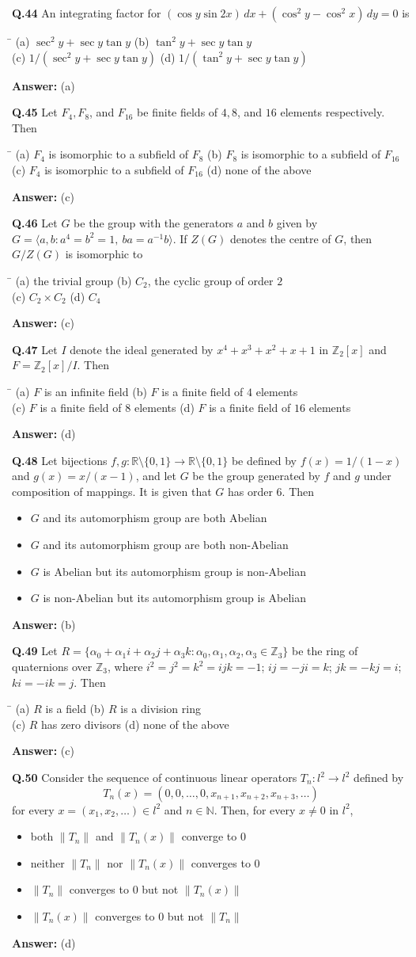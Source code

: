 \documentclass[11pt,a4paper]{article}
\newcommand{\optsfour}[4]{%
  \begin{tabbing}
    \hspace{0.48\linewidth}\=\kill
    (a) #1 \> (b) #2 \\[2pt]
    (c) #3 \> (d) #4
  \end{tabbing}%
}
\newcommand{\optslist}[4]{%
  \begin{itemize}
    \setlength{\itemsep}{2pt}\setlength{\parskip}{0pt}
    \item[(a)] #1
    \item[(b)] #2
    \item[(c)] #3
    \item[(d)] #4
  \end{itemize}%
}
\newcommand{\ans}[1]{\textbf{Answer:} #1\par\medskip}
\begin{document}
\textbf{Q.44} An integrating factor for $(\cos y \sin 2x)\,dx + (\cos^2 y - \cos^2 x)\,dy = 0$ is
\optsfour{$\sec^2 y + \sec y \tan y$}{$\tan^2 y + \sec y \tan y$}{$1/(\sec^2 y + \sec y \tan y)$}{$1/(\tan^2 y + \sec y \tan y)$}
\ans{(a)}

\textbf{Q.45} Let $F_4, F_8$, and $F_{16}$ be finite fields of $4, 8$, and $16$ elements respectively. Then
\optsfour{$F_4$ is isomorphic to a subfield of $F_8$}{$F_8$ is isomorphic to a subfield of $F_{16}$}{$F_4$ is isomorphic to a subfield of $F_{16}$}{none of the above}
\ans{(c)}

\textbf{Q.46} Let $G$ be the group with the generators $a$ and $b$ given by $G = \langle a, b : a^4 = b^2 = 1,\ ba = a^{-1}b \rangle$. If $Z(G)$ denotes the centre of $G$, then $G/Z(G)$ is isomorphic to
\optsfour{the trivial group}{$C_2$, the cyclic group of order $2$}{$C_2 \times C_2$}{$C_4$}
\ans{(c)}

\textbf{Q.47} Let $I$ denote the ideal generated by $x^4 + x^3 + x^2 + x + 1$ in $\mathbb{Z}_2[x]$ and $F = \mathbb{Z}_2[x]/I$. Then
\optsfour{$F$ is an infinite field}{$F$ is a finite field of $4$ elements}{$F$ is a finite field of $8$ elements}{$F$ is a finite field of $16$ elements}
\ans{(d)}

\textbf{Q.48} Let bijections $f, g : \mathbb{R}\setminus\{0,1\} \to \mathbb{R}\setminus\{0,1\}$ be defined by $f(x) = 1/(1 - x)$ and $g(x) = x/(x - 1)$, and let $G$ be the group generated by $f$ and $g$ under composition of mappings. It is given that $G$ has order $6$. Then
\optslist{$G$ and its automorphism group are both Abelian}{$G$ and its automorphism group are both non-Abelian}{$G$ is Abelian but its automorphism group is non-Abelian}{$G$ is non-Abelian but its automorphism group is Abelian}
\ans{(b)}

\textbf{Q.49} Let $R = \{\alpha_0 + \alpha_1 i + \alpha_2 j + \alpha_3 k : \alpha_0, \alpha_1, \alpha_2, \alpha_3 \in \mathbb{Z}_3\}$ be the ring of quaternions over $\mathbb{Z}_3$, where $i^2 = j^2 = k^2 = ijk = -1$; $ij = -ji = k$; $jk = -kj = i$; $ki = -ik = j$. Then
\optsfour{$R$ is a field}{$R$ is a division ring}{$R$ has zero divisors}{none of the above}
\ans{(c)}

\textbf{Q.50} Consider the sequence of continuous linear operators $T_n : l^2 \to l^2$ defined by
\[
  T_n(x) = (0, 0, \dots, 0, x_{n+1}, x_{n+2}, x_{n+3}, \dots)
\]
for every $x = (x_1, x_2, \dots) \in l^2$ and $n \in \mathbb{N}$. Then, for every $x \ne 0$ in $l^2$,
\optslist{both $\|T_n\|$ and $\|T_n(x)\|$ converge to $0$}{neither $\|T_n\|$ nor $\|T_n(x)\|$ converges to $0$}{$\|T_n\|$ converges to $0$ but not $\|T_n(x)\|$}{$\|T_n(x)\|$ converges to $0$ but not $\|T_n\|$}
\ans{(d)}
\end{document}
